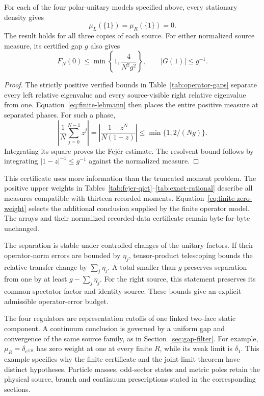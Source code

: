 \begin{proposition}\label{prop:finite-zero-weight}
For each of the four polar-unitary models specified above, every stationary density gives
\begin{equation}\label{eq:finite-zero-weight}
\mu_L(\{1\})=\mu_R(\{1\})=0.
\end{equation}
The result holds for all three copies of each source. For either normalized source measure, its certified gap $g$ also gives
\begin{equation}\label{eq:finite-long-time}
F_N(0)\leq\min\!\left\{1,\frac{4}{N^2g^2}\right\},\qquad
|G(1)|\leq g^{-1}.
\end{equation}
\end{proposition}
\begin{proof}
The strictly positive verified bounds in Table~\ref{tab:operator-gaps} separate every left relative eigenvalue and every source-visible right relative eigenvalue from one. Equation~\eqref{eq:finite-lehmann} then places the entire positive measure at separated phases. For such a phase,
\[
\left|\frac1N\sum_{j=0}^{N-1}z^j\right|
=\left|\frac{1-z^N}{N(1-z)}\right|\leq\min\{1,2/(Ng)\}.
\]
Integrating its square proves the Fej\'er estimate. The resolvent bound follows by integrating $|1-z|^{-1}\leq g^{-1}$ against the normalized measure.
\end{proof}

This certificate uses more information than the truncated moment problem. The positive upper weights in Tables~\ref{tab:fejer-qict}--\ref{tab:exact-rational} describe all measures compatible with thirteen recorded moments. Equation~\eqref{eq:finite-zero-weight} selects the additional conclusion supplied by the finite operator model. The arrays and their normalized recorded-data certificate remain byte-for-byte unchanged.

The separation is stable under controlled changes of the unitary factors. If their operator-norm errors are bounded by $\eta_j$, tensor-product telescoping bounds the relative-transfer change by $\sum_j\eta_j$. A total smaller than $g$ preserves separation from one by at least $g-\sum_j\eta_j$. For the right source, this statement preserves its common spectator factor and identity source. These bounds give an explicit admissible operator-error budget.

The four regulators are representation cutoffs of one linked two-face static component. A continuum conclusion is governed by a uniform gap and convergence of the same source family, as in Section~\ref{sec:gap-filter}. For example, $\mu_R=\delta_{e^{i/R}}$ has zero weight at one at every finite $R$, while its weak limit is $\delta_1$. This example specifies why the finite certificate and the joint-limit theorem have distinct hypotheses. Particle masses, odd-sector states and metric poles retain the physical source, branch and continuum prescriptions stated in the corresponding sections.
